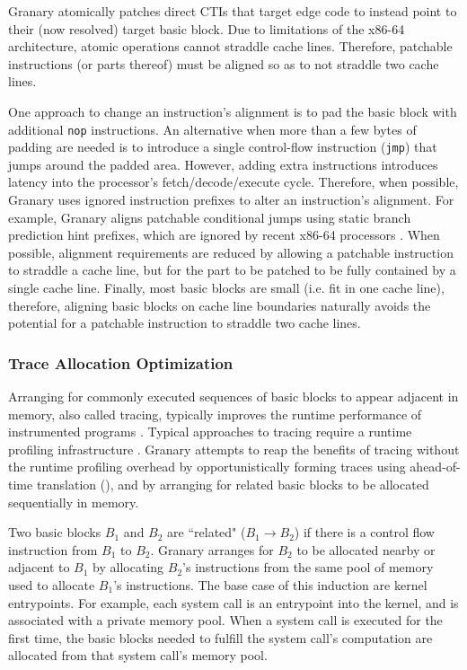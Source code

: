 \documentclass[preprint]{sigplanconf}
\begin{document}
Granary atomically patches direct CTIs that target edge code to instead point to their (now resolved) target basic block. Due to limitations of the x86-64 architecture, atomic operations cannot straddle cache lines. Therefore, patchable instructions (or parts thereof) must be aligned so as to not straddle two cache lines.

One approach to change an instruction's alignment is to pad the basic block with additional \texttt{nop} instructions. An alternative when more than a few bytes of padding are needed is to introduce a single control-flow instruction (\texttt{jmp}) that jumps around the padded area. However, adding extra instructions introduces latency into the processor's fetch/decode/execute cycle. Therefore, when possible, Granary uses ignored instruction prefixes to alter an instruction's alignment. For example, Granary aligns patchable conditional jumps using static branch prediction hint prefixes, which are ignored by recent x86-64 processors \cite{AgnerMicroarchitecture}. When possible, alignment requirements are reduced by allowing a patchable instruction to straddle a cache line, but for the part to be patched to be fully contained by a single cache line. Finally, most basic blocks are small (i.e. fit in one cache line), therefore, aligning basic blocks on cache line boundaries naturally avoids the potential for a patchable instruction to straddle two cache lines.



\subsubsection{Trace Allocation Optimization}\label{sec:trace_alloc}
Arranging for commonly executed sequences of basic blocks to appear adjacent in memory, also called tracing, typically improves the runtime performance of instrumented programs \cite{DynamoRIO}. Typical approaches to tracing require a runtime profiling infrastructure \cite{DynamoRIOOptimization}. Granary attempts to reap the benefits of tracing without the runtime profiling overhead by opportunistically forming traces using ahead-of-time translation (), and by arranging for related basic blocks to be allocated sequentially in memory.

Two basic blocks $B_1$ and $B_2$ are ``related" ($B_1 \to B_2$) if there is a control flow instruction from $B_1$ to $B_2$. Granary arranges for $B_2$ to be allocated nearby or adjacent to $B_1$ by allocating $B_2$'s instructions from the same pool of memory used to allocate $B_1$'s instructions. The base case of this induction are kernel entrypoints. For example, each system call is an entrypoint into the kernel, and is associated with a private memory pool. When a system call is executed for the first time, the basic blocks needed to fulfill the system call's computation are allocated from that system call's memory pool.
\end{document}
